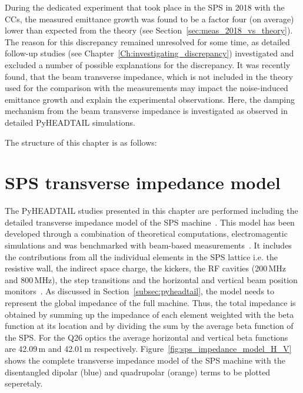 
During the dedicated experiment that took place in the SPS
in 2018 with the CCs, the measured emittance
growth was found to be a factor four (on average) lower than
expected from the theory (see Section~\ref{sec:meas_2018_vs_theory}). The reason for this discrepancy remained unresolved for some time, as detailed follow-up studies (see Chapter~\ref{Ch:investigating_discrepancy}) investigated and excluded a number of possible explanations for the discrepancy.
It was recently found, that the beam transverse impedance, which is not included in the theory~\cite{PhysRevSTAB.18.101001} used for the comparison with the measurements may impact the noise-induced emittance growth and explain the experimental observations. Here, the damping mechanism from the beam transverse impedance is investigated as observed in detailed PyHEADTAIL simulations.

The structure of this chapter is as follows:




\section{SPS transverse impedance model}\label{sec:sps_impedance_model}
The PyHEADTAIL studies presented in this chapter are performed including the detailed transverse impedance model of the SPS machine~\cite{sps_impedance_model_git}. This model has been developed through a combination of theoretical computations, electromagentic simulations and was benchmarked with beam-based measurements~\cite{Salvant:1274254, Zannini:1561199, Salvant:1271349, Zannini:2141779}. 
It includes the contributions from all the individual elements in the SPS lattice i.e. the resistive wall, the indirect space charge, the kickers, the RF cavities (200\,MHz and 800\,MHz), the step transitions and the horizontal and vertical beam position monitors~\cite{Zannini:2141779}. As discussed in  Section~\ref{subsec:pyheadtail}, the model needs to represent the global impedance of the full machine. Thus, the total impedance is obtained by summing up the impedance of each element weighted with the beta function at its location and by dividing the sum by the average beta function of the SPS. For the Q26 optics the average horizontal and vertical beta functions are 42.09\,m and 42.01\,m respectively.
Figure~\ref{fig:sps_impedance_model_H_V} shows the complete transverse impedance model of the SPS machine with the disentangled dipolar (blue) and quadrupolar (orange) terms to be plotted seperetaly. 

